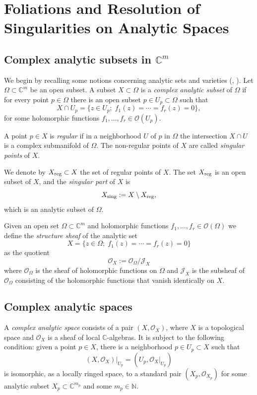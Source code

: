 \documentclass[11pt,twoside]{amsart}
\newcommand{\C}{\mathbb C}
\newcommand{\N}{\mathbb N}
\newcommand{\OO}{\mathcal O}
\newcommand{\J}{\mathcal J}
\theoremstyle{definition}
\begin{document}
\section{Foliations and Resolution of Singularities on Analytic Spaces}\label{sec:preliminaries}

\subsection{Complex analytic subsets in \texorpdfstring{$\C^m$}{complex affine space}}
We begin by recalling some notions concerning analytic sets and varieties (\cite{Chirka1989}, \cite{GunningRossi1965}).
Let $\Omega\subset \C^m$ be an open subset. A subset $X\subset\Omega$ is a \textit{complex analytic subset} of $\Omega$ if for every point $p\in\Omega$ there is an open subset $p\in U_p\subset\Omega$ such that
\[
X\cap U_p=\{z\in U_p;\; f_1(z)=\cdots=f_r(z)=0\},
\]
for some holomorphic functions $f_1,\ldots,f_r\in\OO(U_p)$.

A point $p\in X$ is \textit{regular} if in a neighborhood $U$ of $p$ in $\Omega$ the intersection $X\cap U$ is a complex submanifold of $\Omega$. The non-regular points of $X$ are called \textit{singular points} of $X$.

We denote by $X_{\rm reg}\subset X$ the set of regular points of $X$. The set $X_{\rm reg}$ is an open subset of $X$, and the \textit{singular part} of $X$ is
\[
X_{\rm sing}:=X\setminus X_{\rm reg},
\]
which is an analytic subset of $\Omega$.

Given an open set $\Omega\subset\C^m$ and holomorphic functions $f_1,\ldots,f_r\in\OO(\Omega)$ we define the \textit{structure sheaf} of the analytic set
\[
X=\{z\in\Omega;\; f_1(z)=\cdots=f_r(z)=0\}
\]
as the quotient
\[
\OO_X:=\OO_\Omega/\J_X
\]
where $\OO_\Omega$ is the sheaf of holomorphic functions on $\Omega$ and $\J_X$ is the subsheaf of $\OO_\Omega$ consisting of the holomorphic functions that vanish identically on $X$.

\subsection{Complex analytic spaces}

A \textit{complex analytic space} consists of a pair $(X,\OO_X)$, where $X$ is a topological space and $\OO_X$ is a sheaf of local $\C$-algebras. It is subject to the following condition: given a point $p\in X$, there is a neighborhood $p\in U_p\subset X$ such that
\[
(X,\OO_X)|_{U_p}=(U_p,\OO_X|_{U_p})
\]
is isomorphic, as a locally ringed space, to a standard pair $(X_p,\OO_{X_p})$ for some analytic subset $X_p\subset\C^{m_p}$ and some $m_p\in\N$.
\end{document}
